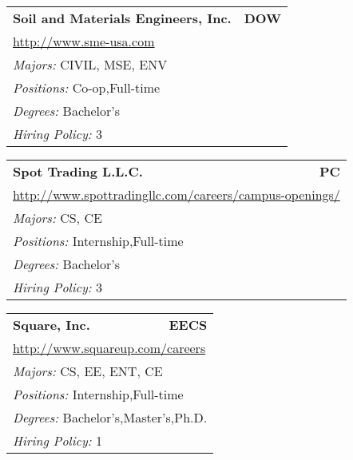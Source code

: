 \documentclass[twoside]{article}
\begin{document}
\begin{center}
\begin{multicols}{3}
\begin{FlushLeft}
\begin{minipage}{.9\columnwidth}
\end{minipage}
 
\begin{minipage}{.9\columnwidth}\begin{tabularx}{.95\columnwidth}{Xr}
                 {\Large\bf Soil and Materials Engineers, Inc.} & {\Large\bf DOW}\\
    \multicolumn{2}{p{.95\columnwidth}}{\url{http://www.sme-usa.com}}\\
    \multicolumn{2}{p{.95\columnwidth}}{\emph{Majors:} CIVIL, MSE, ENV}\\
    \multicolumn{2}{p{.95\columnwidth}}{\emph{Positions:} Co-op,Full-time}\\
    \multicolumn{2}{p{.95\columnwidth}}{\emph{Degrees:} Bachelor's}\\
    \multicolumn{2}{p{.95\columnwidth}}{\emph{Hiring Policy:} 3}\\
    \end{tabularx}
    
\end{minipage}
 
\begin{minipage}{.9\columnwidth}\begin{tabularx}{.95\columnwidth}{Xr}
                 {\Large\bf Spot Trading L.L.C.} & {\Large\bf PC}\\
    \multicolumn{2}{p{.95\columnwidth}}{\url{http://www.spottradingllc.com/careers/campus-openings/}}\\
    \multicolumn{2}{p{.95\columnwidth}}{\emph{Majors:} CS, CE}\\
    \multicolumn{2}{p{.95\columnwidth}}{\emph{Positions:} Internship,Full-time}\\
    \multicolumn{2}{p{.95\columnwidth}}{\emph{Degrees:} Bachelor's}\\
    \multicolumn{2}{p{.95\columnwidth}}{\emph{Hiring Policy:} 3}\\
    \end{tabularx}
    
\end{minipage}
 
\begin{minipage}{.9\columnwidth}\begin{tabularx}{.95\columnwidth}{Xr}
                 {\Large\bf Square, Inc.} & {\Large\bf EECS}\\
    \multicolumn{2}{p{.95\columnwidth}}{\url{http://www.squareup.com/careers}}\\
    \multicolumn{2}{p{.95\columnwidth}}{\emph{Majors:} CS, EE, ENT, CE}\\
    \multicolumn{2}{p{.95\columnwidth}}{\emph{Positions:} Internship,Full-time}\\
    \multicolumn{2}{p{.95\columnwidth}}{\emph{Degrees:} Bachelor's,Master's,Ph.D.}\\
    \multicolumn{2}{p{.95\columnwidth}}{\emph{Hiring Policy:} 1}\\
    \end{tabularx}
    

\end{minipage}
\end{FlushLeft}
\end{multicols}
\end{center}
\end{document}
